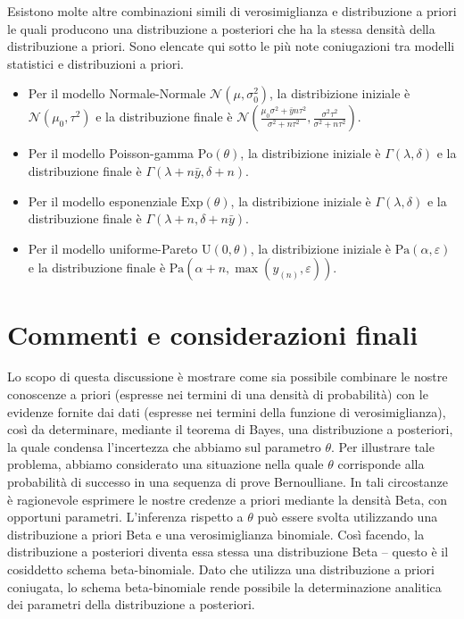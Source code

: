 \documentclass[
  11pt,
]{krantz}
\providecommand{\tightlist}{%
  \setlength{\itemsep}{0pt}\setlength{\parskip}{0pt}}
\theoremstyle{definition}
\theoremstyle{definition}
\theoremstyle{definition}
\theoremstyle{definition}
\theoremstyle{remark}
\begin{document}
Esistono molte altre combinazioni simili di verosimiglianza e distribuzione a priori le quali producono una distribuzione a posteriori che ha la stessa densità della distribuzione a priori. Sono elencate qui sotto le più note coniugazioni tra modelli statistici e distribuzioni a priori.

\begin{itemize}
\tightlist
\item
  Per il modello Normale-Normale \(\mathcal{N}(\mu, \sigma^2_0)\), la distribizione iniziale è \(\mathcal{N}(\mu_0, \tau^2)\) e la distribuzione finale è \(\mathcal{N}\left(\frac{\mu_0\sigma^2 + \bar{y}n\tau^2}{\sigma^2 + n\tau^2}, \frac{\sigma^2\tau^2}{\sigma^2 + n\tau^2} \right)\).
\item
  Per il modello Poisson-gamma \(\text{Po}(\theta)\), la distribizione iniziale è \(\Gamma(\lambda, \delta)\) e la distribuzione finale è \(\Gamma(\lambda + n \bar{y}, \delta +n)\).
\item
  Per il modello esponenziale \(\text{Exp}(\theta)\), la distribizione iniziale è \(\Gamma(\lambda, \delta)\) e la distribuzione finale è \(\Gamma(\lambda + n, \delta +n\bar{y})\).
\item
  Per il modello uniforme-Pareto \(\text{U}(0, \theta)\), la distribizione iniziale è \(\mbox{Pa}(\alpha, \varepsilon)\) e la distribuzione finale è \(\mbox{Pa}(\alpha + n, \max(y_{(n)}, \varepsilon))\).
\end{itemize}

\hypertarget{commenti-e-considerazioni-finali-2}{%
\section*{Commenti e considerazioni finali}\label{commenti-e-considerazioni-finali-2}}


Lo scopo di questa discussione è mostrare come sia possibile combinare le nostre conoscenze a priori (espresse nei termini di una densità di probabilità) con le evidenze fornite dai dati (espresse nei termini della funzione di verosimiglianza), così da determinare, mediante il teorema di Bayes, una distribuzione a posteriori, la quale condensa l'incertezza che abbiamo sul parametro \(\theta\). Per illustrare tale problema, abbiamo considerato una situazione nella quale \(\theta\) corrisponde alla probabilità di successo in una sequenza di prove Bernoulliane. In tali circostanze è ragionevole esprimere le nostre credenze a priori mediante la densità Beta, con opportuni parametri. L'inferenza rispetto a \(\theta\) può essere svolta utilizzando una distribuzione a priori Beta e una verosimiglianza binomiale. Così facendo, la distribuzione a posteriori diventa essa stessa una distribuzione Beta -- questo è il cosiddetto schema beta-binomiale. Dato che utilizza una distribuzione a priori coniugata, lo schema beta-binomiale rende possibile la determinazione analitica dei parametri della distribuzione a posteriori.

  

\printindex
\end{document}
